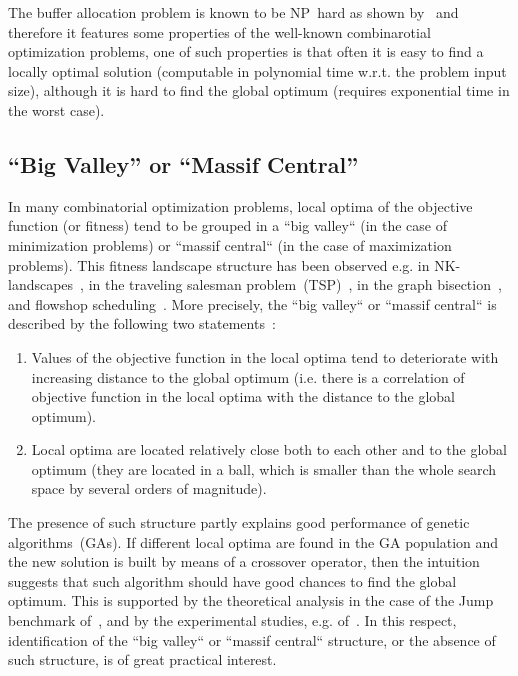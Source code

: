 \documentclass{ifacconf}
\begin{document}
The buffer allocation problem is known to be NP~hard as shown by~\cite{DEKS2013,DEKS2018}  and therefore it features some properties of the
well-known combinarotial optimization problems, one of such properties is that often it is easy to find a locally optimal solution (computable in polynomial time 
w.r.t. the problem input size), although it is hard to find the global optimum (requires exponential time in the worst case).  

\subsection{``Big Valley'' or ``Massif Central''}\label{subsec:landscapes}

In many combinatorial optimization problems, local optima of the objective function (or fitness)  tend to be grouped in a ``big valley`` (in  the case of minimization problems) or
``massif central`` (in  the case of maximization problems). This fitness landscape structure has been observed  e.g. in 
NK-landscapes~\citep{KL87}, in the traveling salesman problem~(TSP)~\citep{Boese,Hains}, in the graph bisection~\citep{Boese}, and 
flowshop scheduling~\citep{Reeves99}. More precisely, the ``big valley`` or
``massif central`` is described by the following two statements~\citep{Boese}:
\begin{enumerate}
\item Values of the objective function in the local optima tend to deteriorate with increasing distance to the global optimum (i.e. there is a correlation 
of objective function in the local optima with the distance to the global optimum).
\item Local optima are located relatively close both to each other and to the global optimum (they are located in a ball, which is smaller than 
the whole search space by several orders of magnitude).
\end{enumerate}
The presence of such structure partly explains good performance of genetic
algorithms~(GAs). If different local optima are found in the GA population and
the new solution is built by means of a crossover operator, 
then the intuition suggests that such algorithm should have good chances to find the
global optimum. This is supported by the theoretical analysis in the case of the Jump benchmark of~\cite{bib:Dang2016a}, and
by the experimental studies, e.g. of~\cite{Hains}.
In this respect, identification of the ``big valley`` or
``massif central`` structure, or the absence of such structure, is of great practical interest.
\end{document}
